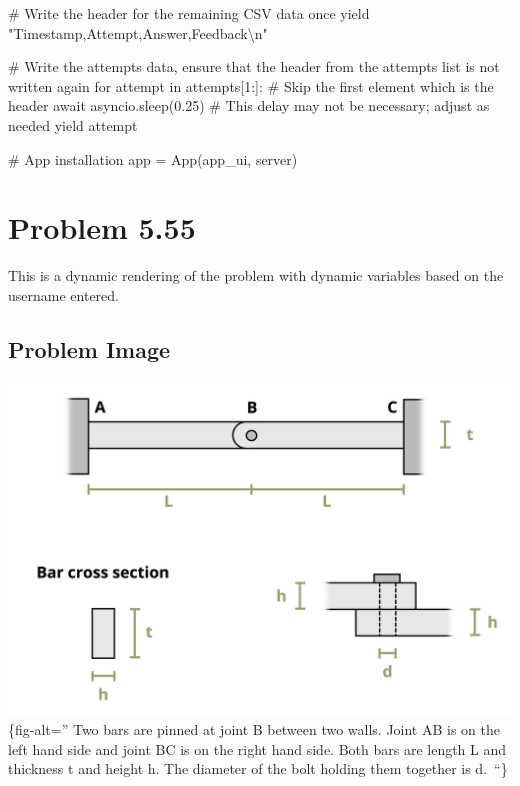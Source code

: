 \documentclass[
  letterpaper,
  DIV=11,
  numbers=noendperiod]{scrreprt}
\newenvironment{Shaded}{\begin{snugshade}}{\end{snugshade}}
\newcommand{\NormalTok}[1]{\textcolor[rgb]{0.00,0.23,0.31}{#1}}
\begin{document}
\begin{Shaded}
\begin{Highlighting}[]
\NormalTok{        \# Write the header for the remaining CSV data once}
\NormalTok{        yield "Timestamp,Attempt,Answer,Feedback\textbackslash{}n"}
        
\NormalTok{        \# Write the attempts data, ensure that the header from the attempts list is not written again}
\NormalTok{        for attempt in attempts[1:]:  \# Skip the first element which is the header}
\NormalTok{            await asyncio.sleep(0.25)  \# This delay may not be necessary; adjust as needed}
\NormalTok{            yield attempt}


\NormalTok{\# App installation}
\NormalTok{app = App(app\_ui, server)}
\end{Highlighting}
\end{Shaded}

\chapter*{Problem 5.55}\label{problem-5.55}


This is a dynamic rendering of the problem with dynamic variables based
on the username entered.

\section*{Problem Image}\label{problem-image-58}


\includegraphics{images/249.png}\{fig-alt='' Two bars are pinned at
joint B between two walls. Joint AB is on the left hand side and joint
BC is on the right hand side. Both bars are length L and thickness t and
height h. The diameter of the bolt holding them together is d.~``\}
\end{document}
